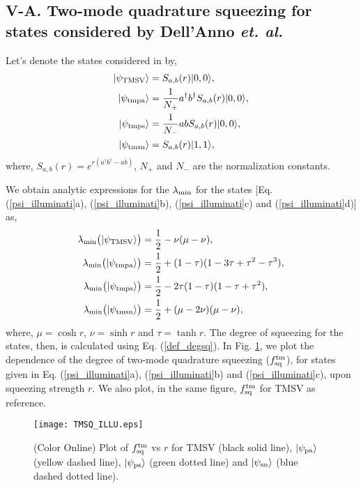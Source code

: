 \documentclass[letter,scriptaddress,twocolumn, prl,showkeys]{revtex4}
\begin{document}
\subsection*{V-A. Two-mode quadrature squeezing for states considered by Dell'Anno {\em et. al.}}

Let's denote the states considered in \cite{tp_illuminati} by, 
\begin{subequations}
\label{psi_illuminati}
\begin{align}
|\psi_{\rm{TMSV}}\rangle&=S_{a,b}(r)|0,0\rangle, \\
|\psi_{\rm{tmpa}}\rangle&=\frac{1}{N_{+}}a^{\dagger}b^{\dagger}S_{a,b}(r)|0,0\rangle, \\
|\psi_{\rm{tmps}}\rangle&=\frac{1}{N_{-}}abS_{a,b}(r)|0,0\rangle, \\
|\psi_{\rm{tmsn}}\rangle&=S_{a,b}(r)|1,1\rangle,
\end{align}
\end{subequations}
where, $S_{a,b}(r)=e^{r(a^{\dagger}b^{\dagger}-ab)}$, $N_{+}$ and $N_{-}$ are the normalization constants.

We obtain analytic expressions for the $\lambda_{\rm{min}}$ for the states [Eq. (\ref{psi_illuminati}a), (\ref{psi_illuminati}b), (\ref{psi_illuminati}c) and (\ref{psi_illuminati}d)] as,
\begin{align}
\lambda_{\rm{min}}\big( |\psi_{\rm{TMSV}}\rangle \big)&=\frac{1}{2}-\nu(\mu-\nu), \nonumber \\
\lambda_{\rm{min}}\big( |\psi_{\rm{tmpa}}\rangle \big)&=\frac{1}{2}+(1-\tau)(1-3\tau+\tau^{2}-\tau^{3}) , \nonumber \\
\lambda_{\rm{min}}\big( |\psi_{\rm{tmps}}\rangle \big)&=\frac{1}{2}-2\tau(1-\tau)(1-\tau+\tau^{2}) , \nonumber \\
\lambda_{\rm{min}}\big( |\psi_{\rm{tmsn}}\rangle \big)&=\frac{1}{2}+(\mu-2\nu)(\mu-\nu),
\end{align}
where, $\mu=\cosh r$, $\nu=\sinh r$ and $\tau=\tanh r$. 
The degree of squeezing for the states, then, is calculated using Eq. (\ref{def_degsq}). 
In Fig. \ref{fig_tmsq_illu}, we plot the dependence of the degree of two-mode quadrature squeezing ($f_{\rm{sq}}^{\rm{tm}}$), for states given in Eq. (\ref{psi_illuminati}a), (\ref{psi_illuminati}b) and (\ref{psi_illuminati}c), upon squeezing strength $r$. 
We also plot, in the same figure, $f_{\rm{sq}}^{\rm{tm}}$ for TMSV as reference.
\begin{figure}[h]
\hspace*{-1 cm}
\texttt{[image: TMSQ\_ILLU.eps]}
\caption{(Color Online) Plot of $f_{\rm{sq}}^{\rm{tm}}$ vs $r$ for TMSV (black solid line), $|\psi_{\rm{pa}}\rangle$ (yellow dashed line), $|\psi_{\rm{ps}}\rangle$ (green dotted line) and $|\psi_{\rm{sn}}\rangle$ (blue dashed dotted line). \label{fig_tmsq_illu}}
\end{figure}
\end{document}
